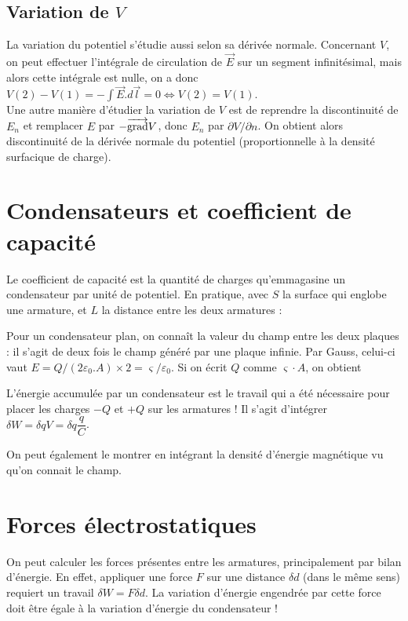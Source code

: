 \documentclass[12pt]{book}
\begin{document}
\subsection{Variation de $V$}
La variation du potentiel s'étudie aussi selon sa dérivée normale. Concernant $V$, on peut effectuer l'intégrale de circulation de $\vec{E}$ sur un segment infinitésimal, mais alors cette intégrale est nulle, on a donc $V(2)-V(1) = -\int \vec{E}.d\vec{l} = 0 \iff V(2) = V(1)$. \\

Une autre manière d'étudier la variation de $V$ est de reprendre la discontinuité de $E_n$ et remplacer $E$ par $-\overrightarrow{\text{grad}} V$, donc $E_n$ par $\partial V / \partial n$. On obtient alors discontinuité de la dérivée normale du potentiel (proportionnelle à la densité surfacique de charge).

\section{Condensateurs et coefficient de capacité}
Le coefficient de capacité est la quantité de charges qu'emmagasine un condensateur par unité de potentiel. En pratique, avec $S$ la surface qui englobe une armature, et $L$ la distance entre les deux armatures :

Pour un condensateur plan, on connaît la valeur du champ entre les deux plaques : il s'agit de deux fois le champ généré par une plaque infinie. Par Gauss, celui-ci vaut $E = Q/(2\varepsilon_0.A) \times 2 = \varsigma/ \varepsilon_0$. Si on écrit $Q$ comme $\varsigma  \cdot A$, on obtient

L'énergie accumulée par un condensateur est le travail qui a été nécessaire pour placer les charges $-Q$ et $+Q$ sur les armatures ! Il s'agit d'intégrer $\delta W = \delta q V = \delta q \dfrac{q}{C}$.

On peut également le montrer en intégrant la densité d'énergie magnétique vu qu'on connait le champ.
\section{Forces électrostatiques}
On peut calculer les forces présentes entre les armatures, principalement par bilan d'énergie. En effet, appliquer une force $F$ sur une distance $\delta d$ (dans le même sens) requiert un travail $\delta W = F \delta d$. La variation d'énergie engendrée par cette force doit être égale à la variation d'énergie du condensateur !
\end{document}
